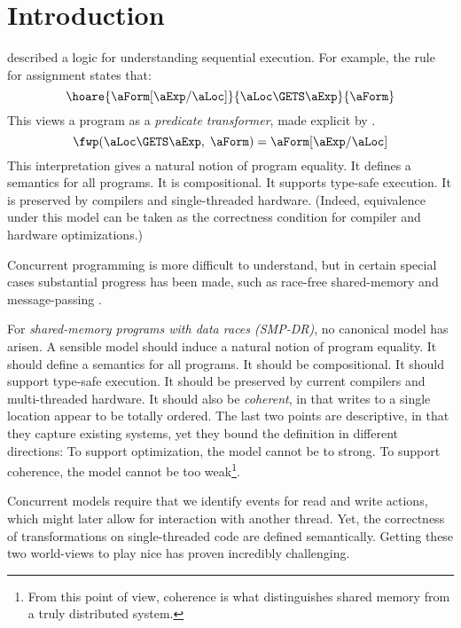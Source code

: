 \section{Introduction}
\label{sec:intro}

\citet{Hoare:1969:ABC:363235.363259} described a logic for understanding
sequential execution.  For example, the rule for assignment states that:
\begin{displaymath}
  \hoare{\aForm[\aExp/\aLoc]}{\aLoc\GETS\aExp}{\aForm}
\end{displaymath}
This views a program as a \emph{predicate transformer}, made explicit by
\citet{Dijkstra:1975:GCN:360933.360975}.
\begin{displaymath}
  \fwp(\aLoc\GETS\aExp,\;\aForm) = \aForm[\aExp/\aLoc]
\end{displaymath}
This interpretation gives a natural notion of program equality.  It defines a
semantics for all programs.  It is compositional.  It supports type-safe
execution.  It is preserved by compilers and single-threaded hardware.
(Indeed, equivalence under this model can be taken as the correctness
condition for compiler and hardware optimizations.)


Concurrent programming is more difficult to understand, but in certain
special cases substantial progress has been made, such as race-free
shared-memory
\citep{OHearn:2007:RCL:1235896.1236121,OHearn:2019:SL:3310134.3211968} and
message-passing \citep{Hennessy:1980:ONC:646234.758793,Cleaveland2018}.

For \emph{shared-memory programs with data races (SMP-DR)}, no canonical
model has arisen.  A sensible model should induce a natural notion of program
equality.  It should define a semantics for all programs.  It should be
compositional.  It should support type-safe execution.  It should be
preserved by current compilers and multi-threaded hardware.  It should also be
\emph{coherent}, in that writes to a single location appear to be totally
ordered.  The last two points are descriptive, in that they capture existing
systems, yet they bound the definition in different directions: To support
optimization, the model cannot be to strong.  To support coherence, the model
cannot be too weak\footnote{From this point of view, coherence is what
  distinguishes shared memory from a truly distributed system.}.

Concurrent models require that we identify events for read and write actions,
which might later allow for interaction with another thread.  Yet, the
correctness of transformations on single-threaded code are defined
semantically.  Getting these two world-views to play nice has proven
incredibly challenging.

